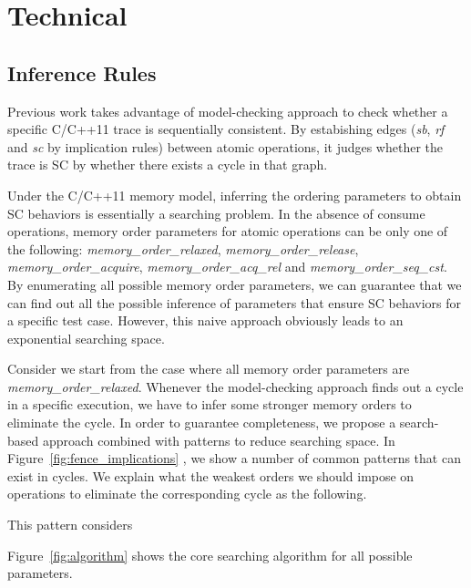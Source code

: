 \section{Technical}\label{sec:technical}

\subsection{Inference Rules}
Previous work takes advantage of model-checking approach to check whether a
specific C/C++11 trace is sequentially consistent. By estabishing edges
(\textit{sb}, \textit{rf} and \textit{sc} by implication rules) between atomic
operations, it judges whether the trace is SC by whether there exists a cycle in
that graph. 

Under the C/C++11 memory model, inferring the ordering parameters to obtain SC
behaviors is essentially a searching problem. In the absence of consume
operations, memory order parameters for atomic operations can be only one of the
following: \textit{memory\_order\_relaxed}, \textit{memory\_order\_release},
\textit{memory\_order\_acquire}, \textit{memory\_order\_acq\_rel} and
\textit{memory\_order\_seq\_cst}. By enumerating all possible memory order
parameters, we can guarantee that we can find out all the possible inference of
parameters that ensure SC behaviors for a specific test case. However, this
naive approach obviously leads to an exponential searching space.

Consider we start from the case where all memory order parameters are
\textit{memory\_order\_relaxed}. Whenever the model-checking approach finds out
a cycle in a specific execution, we have to infer some stronger memory orders to
eliminate the cycle. In order to guarantee completeness, we propose a
search-based approach combined with patterns to reduce searching space.  In
Figure~\ref{fig:fence_implications} , we show a number of common patterns that
can exist in cycles. We explain what the weakest orders we should impose on
operations to eliminate the corresponding cycle as the following.

 This pattern considers 









Figure~\ref{fig:algorithm} shows the core searching algorithm for all possible
parameters.

